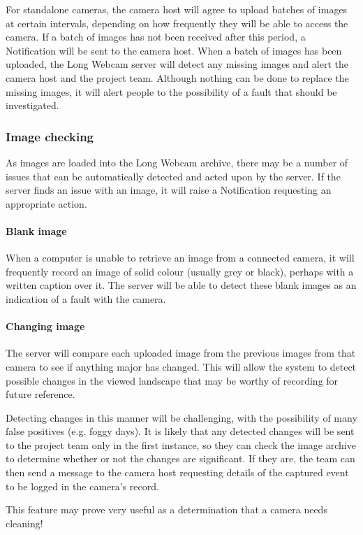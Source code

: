 \documentclass[11pt]{article}
\begin{document}
For standalone cameras, the camera host will agree to upload batches of images at certain intervals, depending on how frequently they will be able to access the camera. If a batch of images has not been received after this period, a Notification will be sent to the camera host. When a batch of images has been uploaded, the Long Webcam server will detect any missing images and alert the camera host and the project team. Although nothing can be done to replace the missing images, it will alert people to the possibility of a fault that should be investigated.

\subsubsection{Image checking}
As images are loaded into the Long Webcam archive, there may be a number of issues that can be automatically detected and acted upon by the server. If the server finds an issue with an image, it will raise a Notification requesting an appropriate action.

\paragraph{Blank image}
When a computer is unable to retrieve an image from a connected camera, it will frequently record an image of solid colour (usually grey or black), perhaps with a written caption over it. The server will be able to detect these blank images as an indication of a fault with the camera.

\paragraph{Changing image}
The server will compare each uploaded image from the previous images from that camera to see if anything major has changed. This will allow the system to detect possible changes in the viewed landscape that may be worthy of recording for future reference.

Detecting changes in this manner will be challenging, with the possibility of many false positives (e.g. foggy days). It is likely that any detected changes will be sent to the project team only in the first instance, so they can check the image archive to determine whether or not the changes are significant. If they are, the team can then send a message to the camera host requesting details of the captured event to be logged in the camera's record.

This feature may prove very useful as a determination that a camera needs cleaning!
\end{document}
